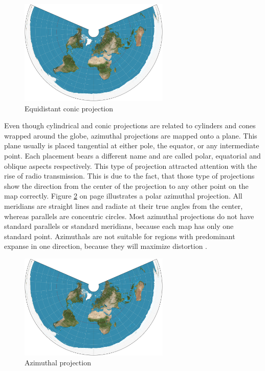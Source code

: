 \begin{enumerate}
\begin{figure}[!htb]
\centering
\includegraphics[height=5cm,keepaspectratio]{images/methods/projections/equidistant.jpg}
\caption[
    Equidistant conic projection, Urldate: 07.2016 \newline
    \small\texttt{\url{https://upload.wikimedia.org/wikipedia/commons/d/d8/Equidistant_conic_projection_SW.JPG}}.
]{Equidistant conic projection}
\label{fig:projections-equidistant}
\end{figure}

\end{enumerate}
Even though cylindrical and conic projections are related to cylinders and cones wrapped around the globe, azimuthal projections are mapped onto a plane. This plane usually is placed tan­gen­ti­al at either pole, the equator, or any intermediate point. Each placement bears a different name and are called polar, equatorial and oblique aspects respectively. This type of projection attracted attention with the rise of radio transmission. This is due to the fact, that those type of projections show the direction from the center of the projection to any other point on the map correctly. Figure \ref{fig:projections-azimuthal} on page \pageref{fig:projections-azimuthal} illustrates a polar azimuthal projection. All meridians are straight lines and radiate at their true angles from the center, whereas parallels are concentric circles. Most azimuthal projections do not have standard parallels or standard meridians, because each map has only one standard point. Azimuthals are not suitable for regions with predominant expanse in one direction, because they will maximize distortion .

\begin{figure}[!htb]
\centering
\includegraphics[height=5cm,keepaspectratio]{images/methods/projections/equidistant.jpg}
\caption[
    Azimuthal projection, Urldate: 07.2016 \newline
    \small\texttt{\url{https://upload.wikimedia.org/wikipedia/commons/e/ec/Azimuthal_equidistant_projection_SW.jpg}}.
]{Azimuthal projection}
\label{fig:projections-azimuthal}
\end{figure}